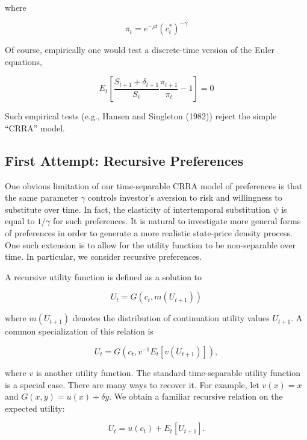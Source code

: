 \documentclass[\topdir/lecture\_notes.tex]{subfiles}
\begin{document}
where

\begin{equation}
\pi_{t}=e^{-\rho t}\left(c_{t}^{*}\right)^{-\gamma}
\end{equation}

Of course, empirically one would test a discrete-time version of the Euler equations,

\begin{equation}
E_{t}\left[\frac{S_{t+1}+\delta_{t+1}}{S_{t}} \frac{\pi_{t+1}}{\pi_{t}}-1\right]=0
\end{equation}

Such empirical tests (e.g., Hansen and Singleton (1982)) reject the simple ``CRRA'' model.

\subsection{First Attempt: Recursive Preferences}
One obvious limitation of our time-separable CRRA model of preferences is that the same parameter \(\gamma\) controls investor's aversion to risk and willingness to substitute over time. In fact, the elasticity of intertemporal substitution \(\psi\) is equal to \(1 / \gamma\) for such preferences. It is natural to investigate more general forms of preferences in order to generate a more realistic state-price density process. One such extension is to allow for the utility function to be non-separable over time. In particular, we consider recursive preferences.

A recursive utility function is defined as a solution to

\begin{equation}
U_{t}=G\left(c_{t}, m\left(U_{t+1}\right)\right)
\end{equation}

where \(m\left(U_{t+1}\right)\) denotes the distribution of continuation utility values \(U_{t+1}\). A common specialization of this relation is

\begin{equation}
U_{t}=G\left(c_{t}, v^{-1} E_{t}\left[v\left(U_{t+1}\right)\right]\right),
\end{equation}

where \(v\) is another utility function. The standard time-separable utility function is a special case. There are many ways to recover it. For example, let \(v(x)=x\) and \(G(x, y)=u(x)+\delta y\). We obtain a familiar recursive relation on the expected utility:

\begin{equation}
U_{t}=u\left(c_{t}\right)+E_{t}\left[U_{t+1}\right] .
\end{equation}
\end{document}
